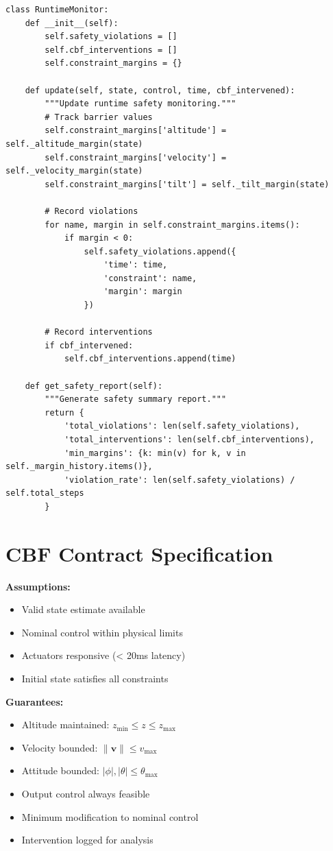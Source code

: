 \begin{lstlisting}[caption={RuntimeMonitor class}]
class RuntimeMonitor:
    def __init__(self):
        self.safety_violations = []
        self.cbf_interventions = []
        self.constraint_margins = {}

    def update(self, state, control, time, cbf_intervened):
        """Update runtime safety monitoring."""
        # Track barrier values
        self.constraint_margins['altitude'] = self._altitude_margin(state)
        self.constraint_margins['velocity'] = self._velocity_margin(state)
        self.constraint_margins['tilt'] = self._tilt_margin(state)

        # Record violations
        for name, margin in self.constraint_margins.items():
            if margin < 0:
                self.safety_violations.append({
                    'time': time,
                    'constraint': name,
                    'margin': margin
                })

        # Record interventions
        if cbf_intervened:
            self.cbf_interventions.append(time)

    def get_safety_report(self):
        """Generate safety summary report."""
        return {
            'total_violations': len(self.safety_violations),
            'total_interventions': len(self.cbf_interventions),
            'min_margins': {k: min(v) for k, v in self._margin_history.items()},
            'violation_rate': len(self.safety_violations) / self.total_steps
        }
\end{lstlisting}

\section{CBF Contract Specification}

\begin{contractbox}
\textbf{Assumptions:}
\begin{itemize}
    \item Valid state estimate available
    \item Nominal control within physical limits
    \item Actuators responsive (< 20ms latency)
    \item Initial state satisfies all constraints
\end{itemize}

\textbf{Guarantees:}
\begin{itemize}
    \item Altitude maintained: $z_{\min} \leq z \leq z_{\max}$
    \item Velocity bounded: $\|\mathbf{v}\| \leq v_{\max}$
    \item Attitude bounded: $|\phi|, |\theta| \leq \theta_{\max}$
    \item Output control always feasible
    \item Minimum modification to nominal control
    \item Intervention logged for analysis
\end{itemize}
\end{contractbox}

